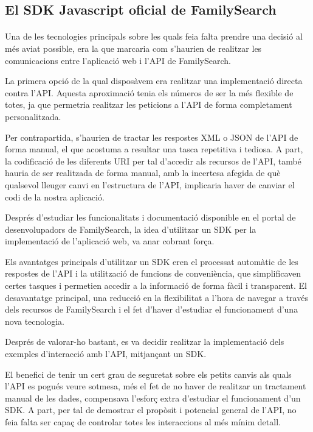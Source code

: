 \subsection{El SDK Javascript oficial de FamilySearch}

    \paragraph{}
    Una de les tecnologies principals sobre les quals feia falta prendre una decisió al més aviat possible, era la que marcaria com s'haurien de realitzar les comunicacions entre l’aplicació web i l’API de FamilySearch.

    La primera opció de la qual disposàvem era realitzar una implementació directa contra l’API. Aquesta aproximació tenia els números de ser la més flexible de totes, ja que permetria realitzar les peticions a l’API de forma completament personalitzada.

    Per contrapartida, s'haurien de tractar les respostes XML o JSON de l’API de forma manual, el que acostuma a resultar una tasca repetitiva i tediosa. A part, la codificació de les diferents URI per tal d’accedir als recursos de l’API, també hauria de ser realitzada de forma manual, amb la incertesa afegida de què qualsevol lleuger canvi en l’estructura de l’API, implicaria haver de canviar el codi de la nostra aplicació.

    Després d'estudiar les funcionalitats i documentació disponible en el portal de desenvolupadors de FamilySearch, la idea d'utilitzar un SDK per la implementació de l’aplicació web, va anar cobrant força.

    Els avantatges principals d’utilitzar un SDK eren el processat automàtic de les respostes de l’API i la utilització de funcions de conveniència, que simplificaven certes tasques i permetien accedir a la informació de forma fàcil i transparent. El desavantatge principal, una reducció en la flexibilitat a l'hora de navegar a través dels recursos de FamilySearch i el fet d’haver d'estudiar el funcionament d’una nova tecnologia.

    Després de valorar-ho bastant, es va decidir realitzar la implementació dels exem\-ples d'interacció amb l’API, mitjançant un SDK.

    El benefici de tenir un cert grau de seguretat sobre els petits canvis als quals l’API es pogués veure sotmesa, més el fet de no haver de realitzar un tractament manual de les dades, compensava l'esforç extra d'estudiar el funcionament d'un SDK. A part, per tal de demostrar el propòsit i potencial general de l’API, no feia falta ser capaç de controlar totes les interaccions al més mínim detall.

